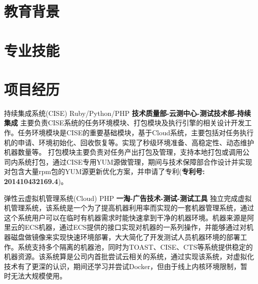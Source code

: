 \documentclass[11pt,a4paper,sans]{moderncv}   %
\title{}                     %
\begin{document}
\begin{CJK*}{UTF8}{gbsn}                       %
\maketitle


\section{教育背景}

\renewcommand{\baselinestretch}{1.2}
\section{专业技能}


\section{项目经历}

{持续集成系统(CISE)}
{Ruby/Python/PHP}
{}{\textbf{技术质量部-云测中心-测试技术部-持续集成}}
{主要负责CISE系统的任务环境模块、打包模块及执行引擎的相关设计开发工作。任务环境模块是CISE的重要基础模块，基于Cloud系统，主要包括对任务执行机的申请、环境初始化、回收恢复等。实现了秒级环境准备、高稳定性、动态维护机器数量等。
打包模块主要负责对任务产出打包及管理，支持本地打包或调用公司内系统打包，通过CISE专用YUM源做管理，期间与技术保障部合作设计并实现对包含大量rpm包的YUM源更新优化方案，并申请了专利(\textbf{专利号: 201410432169.4})。}
\vspace*{0.2\baselineskip}

{弹性云虚拟机管理系统(Cloud)}
{PHP}
{}{\textbf{一淘-广告技术-测试-测试工具}}
{独立完成虚拟机管理系统，该系统是一个为了提高机器利用率而实现的一套机器管理系统，通过这个系统用户可以在临时有机器需求时能快速拿到干净的机器环境。机器来源是阿里云的ECS机器，通过ECS提供的接口实现对机器的一系列操作，并能够通过对机器磁盘做镜像来实现快速环境部署，大大简化了开发测试人员机器环境的部署工作。系统支持多个隔离的机器池，同时为TOAST、CISE、CTS等系统提供稳定的机器资源。该系统算是公司内首批尝试云相关的系统，通过实现该系统，对虚拟化技术有了更深的认识，期间还学习并尝试Docker，但由于线上内核环境限制，暂时无法大规模使用。}
\vspace*{0.2\baselineskip}


\end{CJK*}
\end{document}
